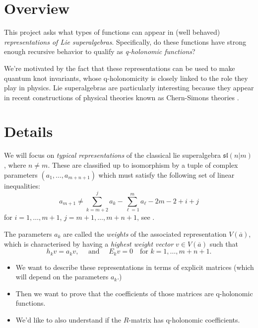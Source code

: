 \documentclass[a4paper]{article}
\begin{document}
\vspace{1cm}

\section*{Overview}
This project asks what types of functions can appear in (well behaved) \emph{representations of Lie superalgebras}.
Specifically, do these functions have strong enough recursive behavior to qualify as \emph{q-holonomic functions}?

We're motivated by the fact that these representations can be used to make quantum knot invariants, whose q-holonomicity is closely linked to the role they play in physics.
Lie superalgebras are particularly interesting because they appear in recent constructions of physical theories known as Chern-Simons theories \cite{Mikhaylov_Witten_2015}.

\section*{Details}

We will focus on \emph{typical representations} of the classical lie superalgebra $\mathfrak{sl}(n|m)$, where $n \neq m$.
These are classified up to isomorphism by a tuple of complex parameters $(a_1,\ldots,a_{m+n+1})$ which must satisfy the following set of linear inequalities:
\begin{equation}
  a_{m+1} \neq \sum_{k=m+2}^j a_k - \sum_{\ell = 1}^m a_\ell -2m - 2 + i + j
\end{equation}
for $i = 1,\ldots,m+1$, $j = m+1,\ldots, m+n+1$, see \cite[Example 1, pg 620]{Kac_1978}.

The parameters $a_k$ are called the \emph{weights} of the associated representation $V(\overline{a})$, which is characterised by having a \emph{highest weight vector} $v \in V(\overline{a})$ such that
\begin{equation}
    h_k v = a_k v, \quad\text{ and }\quad E_k v = 0  \quad\text{for } k = 1,\ldots,m+n+1.
\end{equation}
\begin{itemize}
  \item We want to describe these representations in terms of explicit matrices (which will depend on the parameters $a_k$.)
  \item Then we want to prove that the coefficients of those matrices are q-holonomic functions.
  \item We'd like to also understand if the $R$-matrix has q-holonomic coefficients.
\end{itemize}




\end{document}

